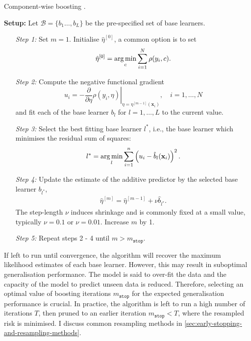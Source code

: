 \begin{algorithm}[!t]
	\caption{Component-wise boosting \autocite{buhlmannBoostingAlgorithmsRegularization2007}.}\label{alg:componentwiseboosting}
	\textbf{Setup:} Let $\mathcal{B} = \lbrace b_1 \dots, b_L \rbrace$ be the pre-specified set of base learners.
	\begin{itemize}
		\item[\textit{Step 1:}] Set $m = 1$. Initialise $\hat{\eta}^{[0]}$, a common option is to set 
		\begin{equation*}
			\hat{\eta}^{[0]} = \operatorname*{arg\,min}_c \sum_{i = 1}^{N} \rho(y_i, c).
		\end{equation*}
		
		\item[\textit{Step 2:}] Compute the negative functional gradient 
		\begin{equation*}
			u_i = \left. -\frac{\partial}{\partial \eta} \rho (y_i, \eta) \right \rvert_{\eta = \eta^{[m-1]} (\mathbf{x}_i)}, \quad i = 1, \dots, N
		\end{equation*}
		and fit each of the base learner $b_{l}$ for $l = 1, \dots, L$ to the current value.
		
		\item[\textit{Step 3:}] Select the best fitting base learner $l^*$, i.e., the base learner which minimises the residual sum of squares:
		\begin{equation*}
			l^* = \operatorname*{arg\,min}_{l} \sum_{i = 1}^{n} \left(u_i - \hat{b}_l (\mathbf{x}_i) \right)^2.
		\end{equation*}
		
		\item[\textit{Step 4:}] Update the estimate of the additive predictor by the selected base learner $b_{l^*}$,
		\begin{align*}
			\hat{\eta}^{[m]} = \hat{\eta}^{[m-1]} + \nu \hat{b}_{l^*}.
		\end{align*}
		The step-length $\nu$ induces shrinkage and is commonly fixed at a small value, typically $\nu = 0.1$ or $\nu = 0.01$. Increase $m$ by 1. 
		
		\item[\textit{Step 5:}] Repeat steps 2 - 4 until $m > m_{\mathtt{stop}}$.
	\end{itemize}
\end{algorithm}

If left to run until convergence, the algorithm will recover the maximum likelihood estimates of each base learner. However, this may result in suboptimal generalisation performance. The model is said to over-fit the data and the capacity of the model to predict unseen data is reduced. Therefore, selecting an optimal value of boosting iterations $m_{\mathtt{stop}}$ for the expected generalisation performance is crucial. In practice, the algorithm is left to run a high number of iterations $T$, then pruned to an earlier iteration $m_{\mathtt{stop}} < T$, where the resampled risk is minimised. I discuss common resampling methods in \autoref{sec:early-stopping-and-resampling-methods}.

